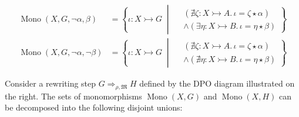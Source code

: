 \begin{notation}
\begin{align*}
        \\
        \operatorname{Mono}(X,G,\lnot \alpha, \beta) &= \left\{ 
            \iota \colon X \rightarrowtail G \;\middle|\; 
                \begin{aligned}  
                    &(\nexists \zeta \colon X \rightarrowtail A.\, \iota = \zeta \star \alpha) \\ 
                    &\land (\exists \eta \colon X \rightarrowtail B.\, \iota = \eta \star \beta)
                \end{aligned}
        \right\}
        \\
        \operatorname{Mono}(X,G,\lnot \alpha, \lnot \beta) &= \left\{ 
            \iota \colon X \rightarrowtail G \;\middle|\; 
                \begin{aligned}
                    &(\nexists \zeta \colon X \rightarrowtail A.\, \iota = \zeta \star \alpha) \\
                    &\land (\nexists \eta \colon X \rightarrowtail B.\, \iota = \eta \star \beta)
                \end{aligned}
        \right\}
    \end{align*}
\end{notation}
\noindent
\begin{minipage}{0.7\textwidth}\setlength{\parindent}{1em}
\noindent Consider a rewriting step \( G \Rightarrow_{\rho,\mathfrak{M}} H \) defined by the DPO diagram illustrated on the right. The sets of monomorphisms \( \operatorname{Mono}(X,G) \) and \( \operatorname{Mono}(X,H) \) can be decomposed into the following disjoint unions:
\end{minipage}%
